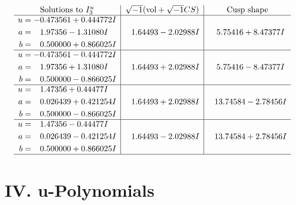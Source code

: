 \documentclass[1p]{elsarticle_modified}
\theoremstyle{definition}
\newcommand{\I}{\sqrt{-1}}
\begin{document}
$$\begin{array}{c|c|c}  
\text{Solutions to }I^u_{3}& \I (\text{vol} + \sqrt{-1}CS) & \text{Cusp shape}\\
 \hline 
\begin{aligned}
u &= -0.473561 + 0.444772 I \\
a &= \phantom{-}1.97356 - 1.31080 I \\
b &= \phantom{-}0.500000 + 0.866025 I\end{aligned}
 & \phantom{-}1.64493 - 2.02988 I & \phantom{-}5.75416 + 8.47377 I \\ \hline\begin{aligned}
u &= -0.473561 - 0.444772 I \\
a &= \phantom{-}1.97356 + 1.31080 I \\
b &= \phantom{-}0.500000 - 0.866025 I\end{aligned}
 & \phantom{-}1.64493 + 2.02988 I & \phantom{-}5.75416 - 8.47377 I \\ \hline\begin{aligned}
u &= \phantom{-}1.47356 + 0.44477 I \\
a &= \phantom{-}0.026439 + 0.421254 I \\
b &= \phantom{-}0.500000 - 0.866025 I\end{aligned}
 & \phantom{-}1.64493 + 2.02988 I & \phantom{-}13.74584 - 2.78456 I \\ \hline\begin{aligned}
u &= \phantom{-}1.47356 - 0.44477 I \\
a &= \phantom{-}0.026439 - 0.421254 I \\
b &= \phantom{-}0.500000 + 0.866025 I\end{aligned}
 & \phantom{-}1.64493 - 2.02988 I & \phantom{-}13.74584 + 2.78456 I\\
 \hline 
 \end{array}$$\newpage
\newpage\renewcommand{\arraystretch}{1}
\centering \section*{ IV. u-Polynomials}
\end{document}
